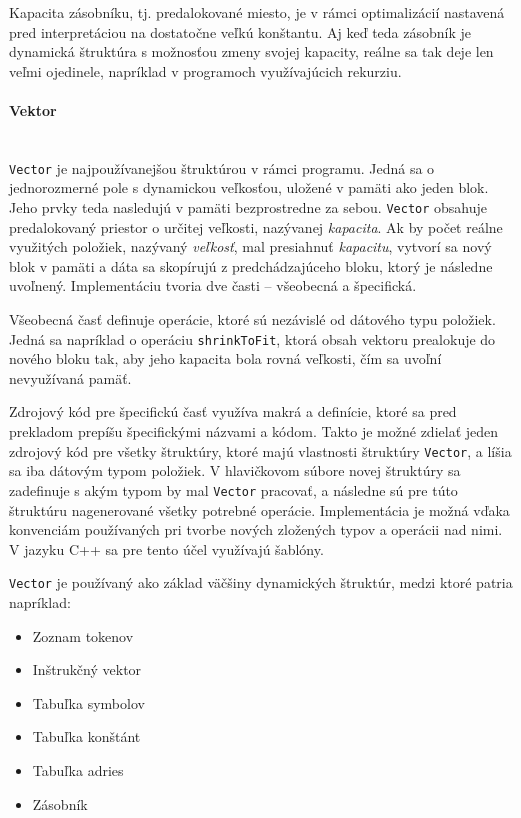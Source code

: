 \documentclass[12pt,a4paper,titlepage,final]{article}
\begin{document}
Kapacita zásobníku, tj. predalokované miesto, je v rámci optimalizácií nastavená pred
interpretáciou na dostatočne veľkú konštantu. Aj keď teda zásobník je dynamická štruktúra
s možnosťou zmeny svojej kapacity, reálne sa tak deje len veľmi ojedinele, napríklad v programoch
využívajúcich rekurziu.

\paragraph{Vektor}\mbox{}\\

\texttt{Vector} je najpoužívanejšou štruktúrou v rámci programu. Jedná sa o jednorozmerné pole s
dynamickou veľkosťou, uložené v pamäti ako jeden blok. Jeho prvky teda nasledujú v pamäti bezprostredne
za sebou. \texttt{Vector} obsahuje predalokovaný priestor o určitej veľkosti, nazývanej {\em kapacita}.
Ak by počet reálne využitých položiek, nazývaný {\em veľkosť}, mal presiahnuť {\em kapacitu}, vytvorí
sa nový blok v pamäti a dáta sa skopírujú z predchádzajúceho bloku, ktorý je následne uvoľnený.
Implementáciu tvoria dve časti -- všeobecná a špecifická.

Všeobecná časť definuje operácie, ktoré sú nezávislé od dátového typu položiek. Jedná sa napríklad
o operáciu \texttt{shrinkToFit}, ktorá obsah vektoru prealokuje do nového bloku tak, aby jeho
kapacita bola rovná veľkosti, čím sa uvoľní nevyužívaná pamäť. 

Zdrojový kód pre špecifickú časť využíva makrá a definície, ktoré sa pred prekladom prepíšu
špecifickými názvami a kódom. Takto je možné zdielať jeden zdrojový kód pre všetky štruktúry,
ktoré majú vlastnosti štruktúry \texttt{Vector}, a líšia sa iba dátovým typom položiek. V hlavičkovom
súbore novej štruktúry sa zadefinuje s akým typom by mal \texttt{Vector} pracovať, 
a následne sú pre túto štruktúru nagenerované všetky potrebné operácie. Implementácia je možná vďaka
konvenciám používaných pri tvorbe nových zložených typov a operácii nad nimi. V jazyku C++ sa pre tento účel
využívajú šablóny.

\texttt{Vector} je používaný ako základ väčšiny dynamických štruktúr, medzi ktoré patria napríklad:
\begin{itemize}
    \itemsep0em
    \item Zoznam tokenov
    \item Inštrukčný vektor
    \item Tabuľka symbolov
    \item Tabuľka konštánt
    \item Tabuľka adries
    \item Zásobník
\end{itemize}
\end{document}
